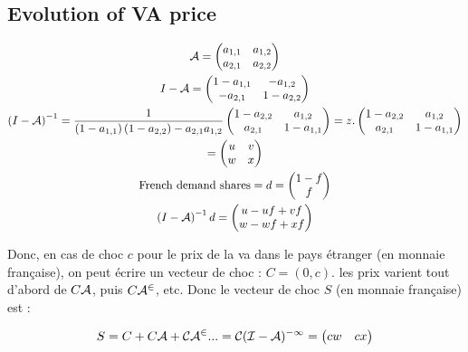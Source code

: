 \documentclass[11pt,a4paper]{article}
\begin{document}
\subsection{Evolution of VA price}
\begin{gather*}
\cal {A} = \left(\begin{matrix}a_{1,1}&a_{1,2}\\a_{2,1}&a_{2,2}\end{matrix}\right)
\\
I-\cal {A}=\left(\begin{matrix}1-a_{1,1}&-a_{1,2}\\-a_{2,1}&1-a_{2,2}\end{matrix}\right)
\\
\left(I-\cal {A}\right)^{-1}=\frac{1}{\left(1-a_{1,1}\right)\left(1-a_{2,2}\right)-a_{2,1}a_{1,2}}\left(\begin{matrix}1-a_{2,2}&a_{1,2}\\a_{2,1}&1-a_{1,1}\end{matrix}\right) =z.\left(\begin{matrix}1-a_{2,2}&a_{1,2}\\a_{2,1}&1-a_{1,1}\end{matrix}\right) \\ 
=\left(\begin{matrix}u&v\\w&x\end{matrix}\right)
\\
\text{French demand shares}=d=\left(\begin{matrix}1-f\\f\end{matrix}\right) \\
\left(I-\cal {A}\right)^{-1}d=\left(\begin{matrix}u-uf+vf\\w-wf+xf\end{matrix}\right)
\end{gather*}

Donc, en cas de choc $c$ pour le prix de la va dans le pays étranger (en monnaie française), on peut écrire un vecteur de choc : $C=\left(0,c\right)$.  les prix varient tout d'abord de  $C\cal {A}$, puis $C\cal {A}^2$, etc. Donc le vecteur de choc $S$ (en monnaie française) est : 


\begin{equation*}
S=C+C\cal {A}+C\cal {A}^2...=C(I-\cal {A})^{-1}=\left(\begin{matrix}cw  &   cx\end{matrix}\right)
\end{equation*}
\end{document}
